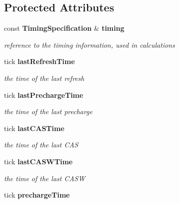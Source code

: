 \subsection*{Protected Attributes}
\begin{CompactItemize}
\item 
const {\bf TimingSpecification} \& {\bf timing}\label{class_d_r_a_m_sim_i_i_1_1rank__c_81850e42370a24ffd6e15596acfa4513}

\begin{CompactList}\small\item\em reference to the timing information, used in calculations \item\end{CompactList}\item 
tick {\bf lastRefreshTime}\label{class_d_r_a_m_sim_i_i_1_1rank__c_28a562e3ec3098f99ccc800cc2da6c25}

\begin{CompactList}\small\item\em the time of the last refresh \item\end{CompactList}\item 
tick {\bf lastPrechargeTime}\label{class_d_r_a_m_sim_i_i_1_1rank__c_ab68d9fabe3d7b731b1bea48b6d8c53e}

\begin{CompactList}\small\item\em the time of the last precharge \item\end{CompactList}\item 
tick {\bf lastCASTime}\label{class_d_r_a_m_sim_i_i_1_1rank__c_3a17ac65cd53992061dbe35ead21525a}

\begin{CompactList}\small\item\em the time of the last CAS \item\end{CompactList}\item 
tick {\bf lastCASWTime}\label{class_d_r_a_m_sim_i_i_1_1rank__c_b1a330954ee62b3116e97fc160afa281}

\begin{CompactList}\small\item\em the time of the last CASW \item\end{CompactList}\item 
tick {\bf prechargeTime}\label{class_d_r_a_m_sim_i_i_1_1rank__c_9a04b59ee6315f8800c39eaf2a5fa6c5}


\end{CompactItemize}
